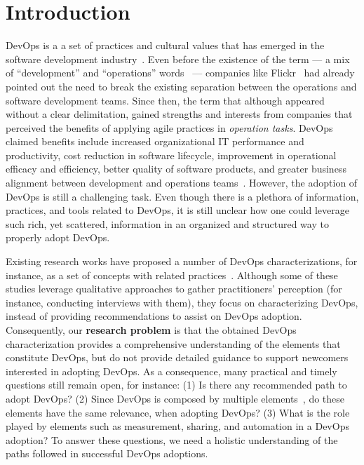 \section{Introduction} \label{sec:introduction}

DevOps is a a set of practices and cultural values that has emerged in the
software development industry~\cite{devops_a_definition_xp_15,dimensions_of_devops_xp_15,extending_dimensions_icsea_16,characterizing_devops_sbes_2016}. Even before
the existence of the term --- a mix of ``development'' and ``operations''
words~\cite{httermann2012devops} --- companies like Flickr~\cite{flickr}
had already pointed out the need to break the existing separation between
the operations and software development teams. Since then, the term
that although appeared without a clear delimitation, gained strengths and interests
from companies that perceived the benefits of applying agile practices in
\emph{operation tasks}.
DevOps claimed benefits include increased organizational IT
performance and productivity, cost reduction in software lifecycle, improvement
in operational efficacy and efficiency, better quality of software products, and
greater business alignment between development and operations
teams~\cite{characterizing_devops_sbes_2016,state_of_devops,DevOps_Adoption_Benefits_and_Challenges}.
However, the adoption of DevOps is still a challenging task. Even though there is a
plethora of information, practices, and tools related to DevOps, it is still unclear
how one could leverage such rich, yet scattered, information in an organized and
structured way to properly adopt DevOps.

Existing research works have proposed a
number of DevOps characterizations, for instance, as a set of concepts with
related
practices~\cite{cooperation_dev_ops_esem_2014,devops_a_definition_xp_15,dimensions_of_devops_xp_15,extending_dimensions_icsea_16,characterizing_devops_sbes_2016,qualitative_devops_journalsw_17}. Although some
of these studies leverage qualitative approaches to gather practitioners' perception (for instance,
conducting interviews with them), they focus on characterizing DevOps,
instead of providing recommendations to assist on DevOps adoption. Consequently,
our {\bf research problem} is that the obtained DevOps characterization provides a
comprehensive understanding of the elements that constitute DevOps, but do not
provide detailed guidance to support newcomers interested in adopting DevOps.
As a consequence, many practical and timely questions still remain open, for
instance: (1) Is there any recommended path to adopt DevOps? (2) Since
DevOps is composed by multiple elements~\cite{dimensions_of_devops_xp_15}, do
these elements have the same relevance, when adopting DevOps?
(3) What is the role played by elements such as measurement, sharing, and automation
in a DevOps adoption? To answer these questions, we need a holistic
understanding of the paths followed in successful DevOps adoptions.

